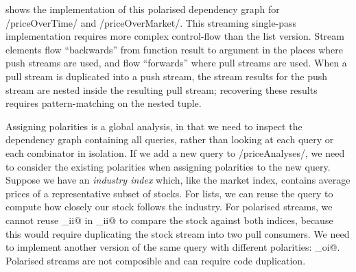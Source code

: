 shows the implementation of this polarised dependency graph for \Hs/priceOverTime/ and \Hs/priceOverMarket/.
This streaming single-pass implementation requires more complex control-flow than the list version.
Stream elements flow ``backwards'' from function result to argument in the places where push streams are used, and flow ``forwards'' where pull streams are used.
When a pull stream is duplicated into a push stream, the stream results for the push stream are nested inside the resulting pull stream; recovering these results requires pattern-matching on the nested tuple.


Assigning polarities is a global analysis, in that we need to inspect the dependency graph containing all queries, rather than looking at each query or each combinator in isolation.
If we add a new query to \Hs/priceAnalyses/, we need to consider the existing polarities when assigning polarities to the new query.
Suppose we have an \emph{industry index} which, like the market index, contains average prices of a representative subset of stocks.
For lists, we can reuse the \Hs@priceOverMarket@ query to compute how closely our stock follows the industry.
For polarised streams, we cannot reuse \Hs@priceOverMarket_ii@ in \Hs@priceAnalyses_ii@ to compare the stock against both indices, because this would require duplicating the stock stream into two pull consumers.
We need to implement another version of the same query with different polarities: \Hs@priceOverMarket_oi@.
Polarised streams are not composible and can require code duplication.

